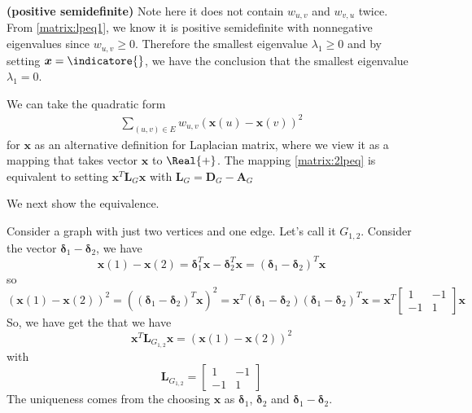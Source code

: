 \documentclass{article}
\newcommand{\bsl}[1]{\boldsymbol{#1}}
\newcommand{\bfs}[1]{\textbf{({#1}) }}
\begin{document}
\begin{rema}{\bfs{positive semidefinite}}\label{matrix:lpremapos}
Note here it does not contain  $w_{u, v}$ and $w_{v, u}$ twice. 
From \cref{matrix:lpeq1}, we know it is positive semidefinite with nonnegative eigenvalues since $w_{u, v}\ge 0$. Therefore the smallest eigenvalue $\lambda_1\ge 0$ and by setting $\bsl{x}=\indicatore{}$, we have the conclusion that the smallest eigenvalue $\lambda_1 = 0$.
\end{rema}


We can take the quadratic form 
\begin{align}
    \sum_{(u, v) \in E} w_{u, v}(\boldsymbol{x}(u)-\boldsymbol{x}(v))^{2} \label{matrix:2lpeq}
\end{align} for $\bsl{x}$ as an alternative definition for Laplacian matrix, where we view it as a mapping that takes vector $\bsl{x}$ to $\Real{+}$. The mapping \cref{matrix:2lpeq} is equivalent to setting $\boldsymbol{x}^{T} \boldsymbol{L}_{G} \boldsymbol{x}$ with $\boldsymbol{L}_{G} = \boldsymbol{D}_{G}-\boldsymbol{A}_{G}$

We next show the equivalence. 


Consider a graph with just two vertices and one edge. Let's call it $G_{1,2}$. Consider the vector $\boldsymbol{\delta}_{1}-\boldsymbol{\delta}_{2}$, we have
$$
\boldsymbol{x}(1)-\boldsymbol{x}(2)=\boldsymbol{\delta}_{1}^{T} \boldsymbol{x}-\boldsymbol{\delta}_{2}^{T} \boldsymbol{x}=\left(\boldsymbol{\delta}_{1}-\boldsymbol{\delta}_{2}\right)^{T} \boldsymbol{x}
$$
so
$$
(\boldsymbol{x}(1)-\boldsymbol{x}(2))^{2}=\left(\left(\boldsymbol{\delta}_{1}-\boldsymbol{\delta}_{2}\right)^{T} \boldsymbol{x}\right)^{2}=\boldsymbol{x}^{T}\left(\boldsymbol{\delta}_{1}-\boldsymbol{\delta}_{2}\right)\left(\boldsymbol{\delta}_{1}-\boldsymbol{\delta}_{2}\right)^{T} \boldsymbol{x}=\boldsymbol{x}^{T}\left[\begin{array}{rr}
1 & -1 \\
-1 & 1
\end{array}\right] \boldsymbol{x}
$$
So, we have get the  that we have
$$
\boldsymbol{x}^{T} \boldsymbol{L}_{G_{1,2}} \boldsymbol{x}=(\boldsymbol{x}(1)-\boldsymbol{x}(2))^{2}
$$ with 
$$
\boldsymbol{L}_{G_{1,2}}=\left[\begin{array}{rr}
1 & -1 \\
-1 & 1
\end{array}\right]
$$
The uniqueness comes from the choosing $\bsl{x}$ as $\boldsymbol{\delta}_{1}$, $\boldsymbol{\delta}_{2}$ and $\boldsymbol{\delta}_{1}-\boldsymbol{\delta}_{2}$.
\end{document}
